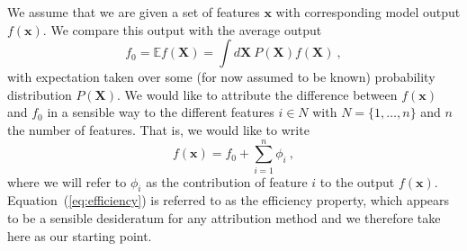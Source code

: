 \documentclass{article}
\newcommand{\vX}{\mathbf{X}}
\newcommand{\vx}{\mathbf{x}}
\newcommand{\expectation}{\mathbb{E}}
\newcommand{\contribution}{{\phi}}
\newcommand{\allfeatures}{{N}}
\begin{document}
We assume that we are given a set of features $\vx$ with corresponding model output $f(\vx)$. We compare this output with the average output
\[
f_0 = \expectation f(\vX) = \int d\vX \: P(\vX) f(\vX) \: ,
\]
with expectation taken over some (for now assumed to be known) probability distribution $P(\vX)$. We would like to attribute the difference between $f(\vx)$ and $f_0$ in a sensible way to the different features $i \in \allfeatures$ with $\allfeatures = \{1,\ldots,n\}$ and $n$ the number of features. That is, we would like to write
\begin{equation}
f(\vx) = f_0 + \sum_{i=1}^n \contribution_i \: ,
\label{eq:efficiency}
\end{equation}
where we will refer to $\contribution_i$ as the contribution of feature $i$ to the output $f(\vx)$. Equation~(\ref{eq:efficiency}) is referred to as the efficiency property, which appears to be a sensible desideratum for any attribution method and we therefore take here as our starting point.
\end{document}
